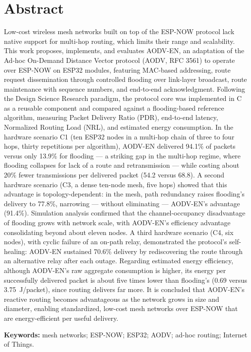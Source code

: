 
\section*{Abstract}

Low-cost wireless mesh networks built on top of the ESP-NOW protocol lack native support
for multi-hop routing, which limits their range and scalability. This work proposes,
implements, and evaluates AODV-EN, an adaptation of the Ad-hoc On-Demand Distance Vector
protocol (AODV, RFC 3561) to operate over ESP-NOW on ESP32 modules, featuring MAC-based
addressing, route request dissemination through controlled flooding over link-layer
broadcast, route maintenance with sequence numbers, and end-to-end acknowledgment.
Following the Design Science Research paradigm, the protocol core was implemented in C as
a reusable component and compared against a flooding-based reference algorithm, measuring
Packet Delivery Ratio (PDR), end-to-end latency, Normalized Routing Load (NRL), and
estimated energy consumption. In the hardware scenario C1 (ten ESP32 nodes in a
multi-hop chain of three to four hops, thirty repetitions per algorithm), AODV-EN
delivered 94.1\% of packets versus only 13.9\% for flooding --- a striking gap in the
multi-hop regime, where flooding collapses for lack of a route and retransmission ---
while costing about 20\% fewer transmissions per delivered packet (54.2 versus 68.8). A
second hardware scenario (C3, a dense ten-node mesh, five hops) showed that this advantage
is topology-dependent: in the mesh, path redundancy raises flooding's delivery to 77.8\%,
narrowing --- without eliminating --- AODV-EN's advantage (91.4\%). Simulation analysis
confirmed that the channel-occupancy disadvantage of flooding grows with network scale,
with AODV-EN's efficiency advantage consolidating beyond about eleven nodes. A third hardware scenario (C4, six
nodes), with cyclic failure of an on-path relay, demonstrated the protocol's self-healing:
AODV-EN sustained 70.6\% delivery by rediscovering the route through an alternative relay
after each outage. Regarding estimated energy efficiency,
although AODV-EN's raw aggregate consumption is higher, its energy per successfully
delivered packet is about five times lower than flooding's (0.69 versus 3.75~J/packet),
since routing delivers far more. It is concluded that AODV-EN's reactive routing becomes
advantageous as the network grows in size and diameter, enabling standardized, low-cost
mesh networks over ESP-NOW that are energy-efficient per useful delivery.

\vspace{1cm}

\noindent
\textbf{Keywords:} mesh networks; ESP-NOW; ESP32; AODV; ad-hoc routing;
Internet of Things.
